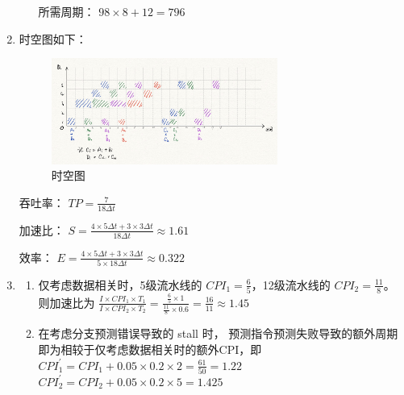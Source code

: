 \documentclass{article}
\begin{document}
\begin{enumerate}[label=\arabic*.]
\begin{enumerate}[label=\alph*.]
            所需周期： $98 \times 8 + 12 = 796$
        \end{enumerate}

        \item 时空图如下：\\
        \begin{figure}[H]
            \centering
            \includegraphics[width=0.7\textwidth]{fig/hw02_q2_fig1.jpg}
            \caption{时空图}
        \end{figure}

        吞吐率： $TP = \frac{7}{18\Delta t}$

        加速比： $S = \frac{4 \times 5\Delta t + 3 \times 3\Delta t}{18\Delta t} \approx 1.61$

        效率： $E = \frac{4 \times 5\Delta t + 3 \times 3\Delta t}{5 \times 18\Delta t} \approx 0.322$

        \item \begin{enumerate}[label=\alph*.]
            \item 仅考虑数据相关时，5级流水线的 $CPI_1 = \frac{6}{5}$，12级流水线的 $CPI_2 = \frac{11}{8}$。\\
            则加速比为 $\frac{I \times CPI_1 \times T_1}{I \times CPI_2 \times T_2} = \frac{\frac{6}{5} \times 1}{\frac{11}{8} \times 0.6} = \frac{16}{11} \approx 1.45 $
            \item 在考虑分支预测错误导致的 stall 时， 预测指令预测失败导致的额外周期即为相较于仅考虑数据相关时的额外CPI，即\\
            $CPI^\prime_1 = CPI_1 + 0.05 \times 0.2 \times 2 = \frac{61}{50} = 1.22$\\
            $CPI^\prime_2 = CPI_2 + 0.05 \times 0.2 \times 5 = 1.425$
        \end{enumerate}
    \end{enumerate}
\end{document}
